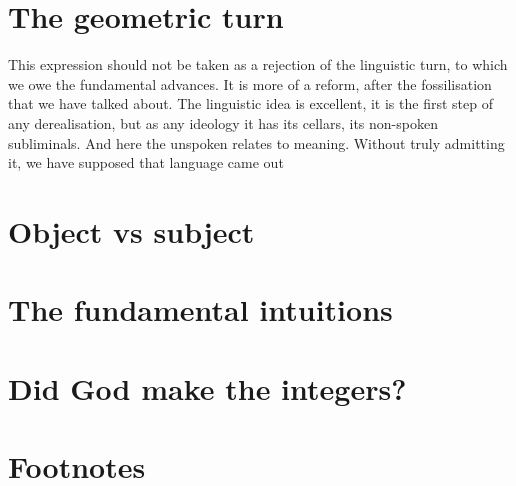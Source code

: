 \documentclass{article}
\begin{document}
\section{The geometric turn}
This expression should not be taken as a rejection of the linguistic turn, to which we owe the fundamental advances. It is more of a reform, after the fossilisation that we have talked about. The linguistic idea is excellent, it is the first step of any derealisation, but as any ideology it has its cellars, its non-spoken subliminals. And here the unspoken relates to meaning. Without truly admitting it, we have supposed that language came out 

\section{Object vs subject}
\section{The fundamental intuitions}
\section{Did God make the integers?}
\section*{Footnotes}
\end{document}
